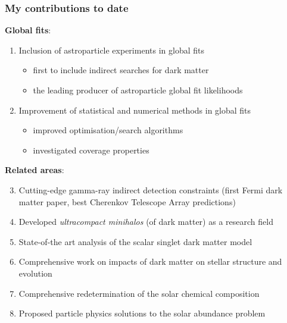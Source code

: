 \documentclass[xcolor=dvipsnames]{beamer}
\begin{document}
\begin{frame}
\frametitle{My contributions to date}

\footnotesize

\textbf{Global fits}:
\begin{enumerate}
\item Inclusion of astroparticle experiments in global fits 
\begin{itemize}
      \item first to include indirect searches for dark matter
      \item the leading producer of astroparticle global fit likelihoods
\end{itemize}
\item Improvement of statistical and numerical methods in global fits
\begin{itemize}
      \item improved optimisation/search algorithms
      \item investigated coverage properties
\end{itemize}
\end{enumerate}

\textbf{Related areas}:
\begin{enumerate}
\setcounter{enumi}{2}
\item Cutting-edge gamma-ray indirect detection constraints (first Fermi dark matter paper, best Cherenkov Telescope Array predictions) 
\item Developed \textit{ultracompact minihalos} (of dark matter) as a research field 
\item State-of-the art analysis of the scalar singlet dark matter model
\item Comprehensive work on impacts of dark matter on stellar structure and evolution
\item Comprehensive redetermination of the solar chemical composition
\item Proposed particle physics solutions to the solar abundance problem
\end{enumerate}

\end{frame}
\end{document}
